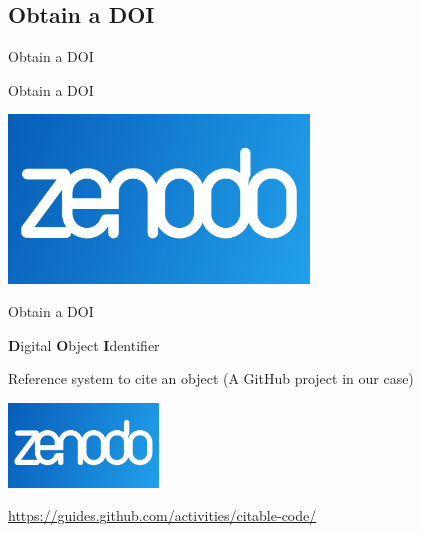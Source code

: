 \subsection{Obtain a DOI}

\begin{frame}{}

\huge{Obtain a DOI}

\end{frame}


\begin{frame}{Obtain a DOI}

\begin{center}
    \includegraphics[width=8cm]{08_sharing/images/zenodo.png}
\end{center}

\end{frame}

\begin{frame}{Obtain a DOI}

\textbf{D}igital \textbf{O}bject \textbf{I}dentifier

Reference system to cite an object (A GitHub project in our case)

\begin{center}
    \includegraphics[width=4cm]{08_sharing/images/zenodo.png}
\end{center}

\url{https://guides.github.com/activities/citable-code/}
\end{frame}

